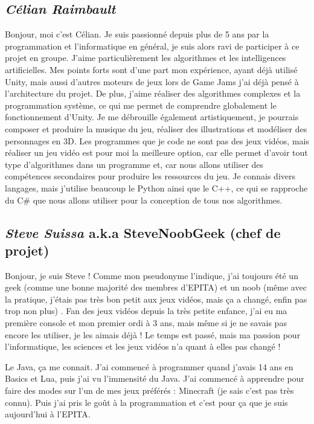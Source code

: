 \documentclass{article}
\begin{document}
\subsection{\emph{Célian Raimbault}}
Bonjour, moi c’est Célian. Je suis passionné depuis plus de 5 ans par la programmation et l’informatique en général, je suis alors ravi de participer à ce projet en groupe. J’aime particulièrement les algorithmes et les intelligences artificielles. Mes points forts sont d’une part mon expérience, ayant déjà utilisé Unity, mais aussi d’autres moteurs de jeux lors de Game Jams j’ai déjà pensé à l’architecture du projet. De plus, j’aime réaliser des algorithmes complexes et la programmation système, ce qui me permet de comprendre globalement le fonctionnement d’Unity. Je me débrouille également artistiquement, je pourrais composer et produire la musique du jeu, réaliser des illustrations et modéliser des personnages en 3D.
Les programmes que je code ne sont pas des jeux vidéos, mais réaliser un jeu vidéo est pour moi la meilleure option, car elle permet d’avoir tout type d’algorithmes dans un programme et, car nous allons utiliser des compétences secondaires pour produire les ressources du jeu. Je connais divers langages, mais j’utilise beaucoup le Python ainsi que le C++, ce qui se rapproche du C\# que nous allons utiliser pour la conception de tous nos algorithmes.

\subsection{\emph{Steve Suissa} a.k.a SteveNoobGeek (chef de projet)}

Bonjour, je suis Steve ! Comme mon pseudonyme l’indique, j’ai toujours été un geek (comme une bonne majorité des membres d’EPITA) et un noob (même avec la pratique, j’étais pas très bon petit aux jeux vidéos, mais ça a changé, enfin pas trop non plus) . Fan des jeux vidéos depuis la très petite enfance, j’ai eu ma première console et mon premier ordi à 3 ans, mais même si je ne savais pas encore les utiliser, je les aimais déjà ! Le temps est passé, mais ma passion pour l’informatique, les sciences et les jeux vidéos n’a quant à elles pas changé ! 

Le Java, ça me connait. J’ai commencé à programmer quand j’avais 14 ans en Basics et Lua, puis j’ai vu l'immensité du Java. J’ai commencé à apprendre pour faire des modes sur l’un de mes jeux préférés : Minecraft (je sais c’est pas très connu). Puis j’ai pris le goût à la programmation et c’est pour ça que je suis aujourd’hui à l’EPITA.
\end{document}

